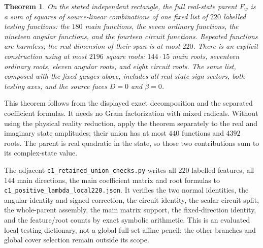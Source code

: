 \documentclass[11pt]{article}
\newtheorem{theorem}{Theorem}
\begin{document}
\begin{theorem}
On the stated independent rectangle, the full real-state parent
$F_w$ is a sum of squares of source-linear combinations of one
fixed list of $220$ labelled testing functions: the $180$ main
functions, the seven ordinary functions, the nineteen angular
functions, and the fourteen circuit functions. Repeated functions
are harmless; the real dimension of their span is at most $220$.
There is an explicit construction using at most $2196$ square
roots: $144\cdot15$ main roots, seventeen ordinary roots, eleven
angular roots, and eight circuit roots. The same list, composed
with the fixed gauges above, includes all real state-sign sectors,
both testing axes, and the source faces $D=0$ and $\beta=0$.
\end{theorem}

This theorem follows from the displayed exact decomposition and
the separated coefficient formulas. It needs no Gram factorization
with mixed radicals. Without using the physical reality reduction,
apply the theorem separately to the real and imaginary state
amplitudes; their union has at most $440$ functions and $4392$
roots. The parent is real quadratic in the state, so those two
contributions sum to its complex-state value.

The adjacent \texttt{c1\_retained\_union\_checks.py} writes all
$220$ labelled features, all $144$ main directions, the main
coefficient matrix and root formulas to
\texttt{c1\_positive\_lambda\_local220.json}. It verifies the two
normal identities, the angular identity and signed correction,
the circuit identity, the scalar circuit split, the whole-parent
assembly, the main matrix support, the fixed-direction identity,
and the feature/root counts by exact symbolic arithmetic.
This is an evaluated local testing dictionary, not a global
full-set affine pencil: the other branches and global cover
selection remain outside its scope.
\end{document}
